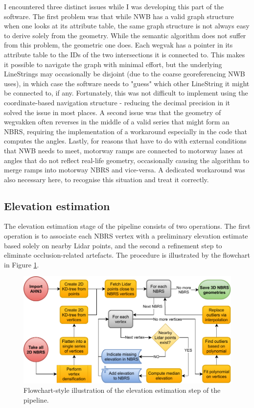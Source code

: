 I encountered three distinct issues while I was developing this part of the software. The first problem was that while NWB has a valid graph structure when one looks at its attribute table, the same graph structure is not always easy to derive solely from the geometry. While the semantic algorithm does not suffer from this problem, the geometric one does. Each wegvak has a pointer in its attribute table to the IDs of the two intersections it is connected to. This makes it possible to navigate the graph with minimal effort, but the underlying LineStrings may occasionally be disjoint (due to the coarse georeferencing NWB uses), in which case the software needs to "guess" which other LineString it might be connected to, if any. Fortunately, this was not difficult to implement using the coordinate-based navigation structure - reducing the decimal precision in it solved the issue in most places. A second issue was that the geometry of wegvakken often reverses in the middle of a valid series that might form an NBRS, requiring the implementation of a workaround especially in the code that computes the angles. Lastly, for reasons that have to do with external conditions that NWB needs to meet, motorway ramps are connected to motorway lanes at angles that do not reflect real-life geometry, occasionally causing the algorithm to merge ramps into motorway NBRS and vice-versa. A dedicated workaround was also necessary here, to recognise this situation and treat it correctly.

\subsection{Elevation estimation}
\label{sub:m_elevationestimation}

The elevation estimation stage of the pipeline consists of two operations. The first operation is to associate each NBRS vertex with a preliminary elevation estimate based solely on nearby Lidar points, and the second a refinement step to eliminate occlusion-related artefacts. The procedure is illustrated by the flowchart in Figure \ref{fig:elevationestimationflow}.

\begin{figure}
    \centering
    \includegraphics[width=0.9\linewidth]{final_report/figs/elevation_estimation.pdf}
    \caption{Flowchart-style illustration of the elevation estimation step of the pipeline.}
    \label{fig:elevationestimationflow}
\end{figure}

